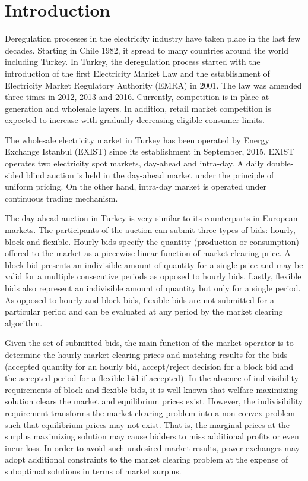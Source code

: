 \documentclass[conference]{IEEEtran}
\begin{document}
\section{Introduction}

Deregulation processes in the electricity industry have taken place in the last few decades. Starting in Chile 1982, it spread to many countries around the world including Turkey. In Turkey, the deregulation process started with the introduction of the first Electricity Market Law and the establishment of Electricity Market Regulatory Authority (EMRA) in 2001. The law was amended three times in 2012, 2013 and 2016. Currently, competition is in place at generation and wholesale layers.  In addition, retail market competition is expected to increase with gradually decreasing eligible consumer limits. 

The wholesale electricity market in Turkey has been operated by Energy Exchange Istanbul (EXIST) since its establishment in September, 2015. EXIST operates two electricity spot markets, day-ahead and intra-day. A daily double-sided blind auction is held in the day-ahead market under the principle of uniform pricing. On the other hand, intra-day market is operated under continuous trading mechanism. 

The day-ahead auction in Turkey is very similar to its counterparts in European markets. The participants of the auction can submit three types of bids: hourly, block and flexible. Hourly bids specify the quantity (production or consumption) offered to the market as a piecewise linear function of market clearing price. A block bid presents an indivisible amount of quantity for a single price and may be valid for a multiple consecutive periods as opposed to hourly bids. Lastly, flexible bids also represent an indivisible amount of quantity but only for a single period. As opposed to hourly and block bids, flexible bids are not submitted for a particular period and can be evaluated at any period by the market clearing algorithm. 

Given the set of submitted bids, the main function of the market operator is to determine the hourly market clearing prices and matching results for the bids (accepted quantity for an hourly bid, accept/reject decision for a block bid and the accepted period for a flexible bid if accepted). In the absence of indivisibility requirements of block and flexible bids, it is well-known that welfare maximizing solution clears the market and equilibrium prices exist. However, the indivisibility requirement transforms the market clearing problem into a non-convex problem such that equilibrium prices may not exist. That is, the marginal prices at the surplus maximizing solution may cause bidders to miss additional profits or even incur loss. In order to avoid such undesired market results, power exchanges may adopt additional constraints to the market clearing problem at the expense of suboptimal solutions in terms of market surplus.
\end{document}
